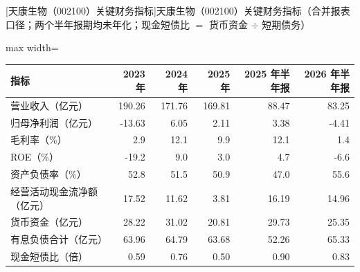 \begin{center}\small\setlength{\tabcolsep}{3.4pt}
[天康生物（002100）关键财务指标]{天康生物（002100）关键财务指标（合并报表口径；两个半年报期均未年化；现金短债比 $=$ 货币资金 $\div$ 短期债务）}
\begin{adjustbox}{max width=\textwidth}
\begin{tabular}{@{}lrrrrr@{}}
\toprule
指标 & 2023 年 & 2024 年 & 2025 年 & 2025 年半年报 & 2026 年半年报 \\
\midrule
营业收入（亿元） & 190.26 & 171.76 & 169.81 & 88.47 & 83.25 \\
归母净利润（亿元） & -13.63 & 6.05 & 2.11 & 3.38 & -4.41 \\
毛利率（\%） & 2.9 & 12.1 & 9.9 & 12.1 & 1.4 \\
ROE（\%） & -19.2 & 9.0 & 3.0 & 4.7 & -6.6 \\
资产负债率（\%） & 52.8 & 51.5 & 50.9 & 47.0 & 55.6 \\
经营活动现金流净额（亿元） & 17.52 & 11.62 & 3.81 & 16.19 & 14.96 \\
货币资金（亿元） & 28.22 & 31.02 & 20.81 & 29.73 & 25.35 \\
有息负债合计（亿元） & 63.96 & 64.79 & 63.68 & 52.26 & 65.33 \\
现金短债比（倍） & 0.59 & 0.76 & 0.50 & 0.90 & 0.83 \\
\bottomrule
\end{tabular}
\end{adjustbox}
\end{center}

